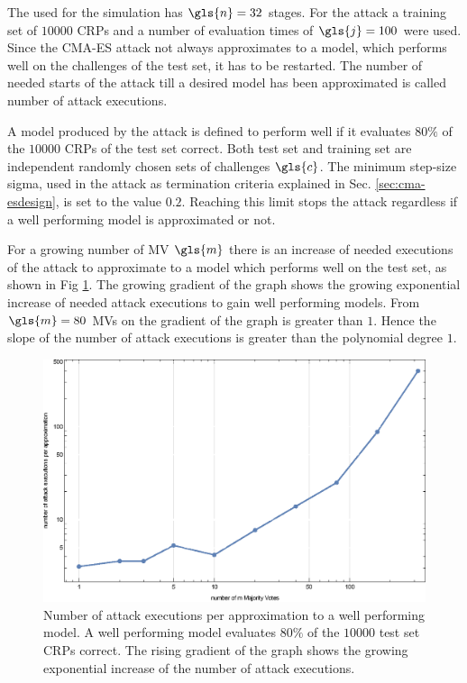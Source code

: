 The \apuf used for the simulation has $\gls{n} = 32$ stages.
For the attack a training set of $10000$ \acp{CRP} and a number of evaluation times of $\gls{j} = 100$ were used.
Since the \ac{CMA-ES} attack not always approximates to a model, which performs well on the challenges of the test set, it has to be restarted.
The number of needed starts of the attack till a desired model has been approximated is called number of attack executions.

A model produced by the attack is defined to perform well if it evaluates $80 \%$ of the $10000$ \acp{CRP} of the test set correct.
Both test set and training set are independent randomly chosen sets of challenges $\gls{c}$.
The minimum step-size sigma, used in the attack as termination criteria explained in Sec. \ref{sec:cma-esdesign}, is set to the value $0.2$.
Reaching this limit stops the attack regardless if a well performing model is approximated or not.

For a growing number of \ac{MV} $\gls{m}$ there is an increase of needed executions of the attack to approximate to a model which performs well on the test set, as shown in Fig \ref{fig:cmasingleattackcorrelation}.
The growing gradient of the graph shows the growing exponential increase of needed attack executions to gain well performing models.
From $\gls{m} = 80$ \acp{MV} on the gradient of the graph is greater than $1$.
Hence the slope of the number of attack executions is greater than the polynomial degree $1$.

\begin{figure}[ht]
\includegraphics[width=1.00\textwidth]{images/single-mv-classification-cma-attack-correlation.eps}
\caption[Needed \acs{CMA-ES} attack executions for \mpufs]{Number of attack executions per approximation to a well performing model. A well performing model evaluates $80 \%$ of the $10000$ test set \acp{CRP} correct. The rising gradient of the graph shows the growing exponential increase of the number of attack executions.}
\label{fig:cmasingleattackcorrelation}
\end{figure}

